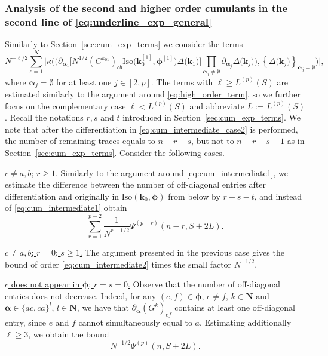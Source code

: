 \documentclass[10pt]{amsart}
\numberwithin{equation}{section}
\newcommand{\nc}{\normalcolor}
\newcommand{\N}{\mathbf{N}}
\begin{document}
\subsubsection{Analysis of the second and higher order cumulants in the second line of \eqref{eq:underline_exp_general}}\label{sec:cum_exp_terms2}
Similarly to Section~\ref{sec:cum_exp_terms} we consider the terms
\begin{equation}
N^{-\ell/2}\sum_{c=1}^N\Bigg|\kappa\Bigg(\bigg(\partial_{\bm{\alpha}_1}\Big[N^{1/2}\left(G^{k_{01}}\right)_{cb}\mathrm{Iso}\big(\bm{k}_0^{[1]},\bm{\phi}^{[1]}\big)\Delta\big(\bm{k}_1\big)\Big] \prod_{\bm{\alpha}_j\neq \emptyset} \partial_{\bm{\alpha}_j}\Delta\big(\bm{k}_j\big)\bigg),\left\lbrace \Delta\big(\bm{k}_j\big)\right\rbrace_{\bm{\alpha}_j=\emptyset}\Bigg)\Bigg|,
\label{eq:cum_intermediate_case2}
\end{equation}
where $\bm{\alpha}_j=\emptyset$ for at least one $j\in [2,p]$.  The terms with $\ell\ge L^{(p)}(S)$ are estimated similarly to the argument around \eqref{eq:high_order_term}, so we further focus on the complementary case $\ell<L^{(p)}(S)$ and abbreviate $L:=L^{(p)}(S)$. \nc Recall the notations $r,s$ and $t$ introduced in Section~\ref{sec:cum_exp_terms}. We note that after the differentiation in \eqref{eq:cum_intermediate_case2} is performed, the number of remaining traces equals to $n-r-s$, but not to $n-r-s-1$ as in Section~\ref{sec:cum_exp_terms}. Consider the following cases.

\smallskip

\noindent\underline{$c\neq a,b$; $r\ge 1$.} Similarly to the argument around \eqref{eq:cum_intermediate1}, we estimate the difference between the number of off-diagonal entries after differentiation and originally in $\mathrm{Iso}(\bm{k}_0,\bm{\phi})$ from below by $r+s-t$, and instead of \eqref{eq:cum_intermediate1} obtain 
\begin{equation}
\sum_{r=1}^{p-2}\frac{1}{N^{r-1/2}} \Psi^{(p-r)}(n-r,S+2L).
\label{eq:cum_intermediate_case2_1}
\end{equation}

\noindent\underline{$c\neq a,b$; $r=0$; $s\ge 1$.} The argument presented in the previous case gives the bound of order \eqref{eq:cum_intermediate2} times the small factor $N^{-1/2}$.


\smallskip

\noindent\underline{$c$ does not appear in $\bm{\phi}$; $r=s=0$.} Observe that the number of off-diagonal entries does not decrease. Indeed, for any $(e,f)\in\bm{\phi}$, $e\neq f$, $k\in\N$ and $\bm{\alpha}\in\{ac,ca\}^l$, $l\in\N$, we have that $\partial_{\bm{\alpha}} (G^k)_{ef}$ contains at least one off-diagonal entry, since $e$ and $f$ cannot simultaneously equal to $a$. Estimating additionally $\ell\ge 3$, we obtain the bound
\begin{equation}
N^{-1/2}\Psi^{(p)}(n,S+2L).
\label{eq:cum_intermediate_case2_2}
\end{equation}
\end{document}
